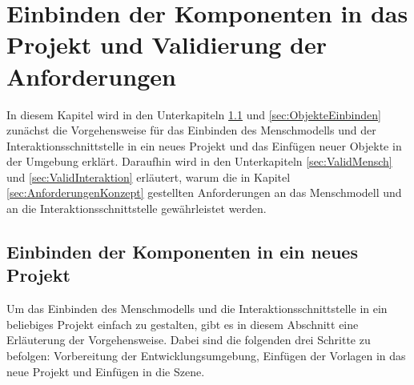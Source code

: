 \chapter{Einbinden der Komponenten in das Projekt und Validierung der Anforderungen}\label{cha:ValidierungDesKonzepts}
In diesem Kapitel wird in den Unterkapiteln \ref{sec:MenschmodellEinbinden} und \ref{sec:ObjekteEinbinden} zunächst die Vorgehensweise für das Einbinden des Menschmodells und der Interaktionsschnittstelle in ein neues Projekt und das Einfügen neuer Objekte in der Umgebung erklärt. Daraufhin wird in den Unterkapiteln \ref{sec:ValidMensch} und \ref{sec:ValidInteraktion} erläutert, warum die in Kapitel \ref{sec:AnforderungenKonzept} gestellten Anforderungen an das Menschmodell und an die Interaktionsschnittstelle gewährleistet werden.

\section{Einbinden der Komponenten in ein neues Projekt}\label{sec:MenschmodellEinbinden}
Um das Einbinden des Menschmodells und die Interaktionsschnittstelle in ein beliebiges Projekt einfach zu gestalten, gibt es in diesem Abschnitt eine Erläuterung der Vorgehensweise. Dabei sind die folgenden drei Schritte zu befolgen: Vorbereitung der Entwicklungsumgebung, Einfügen der Vorlagen in das neue Projekt und Einfügen in die Szene.

